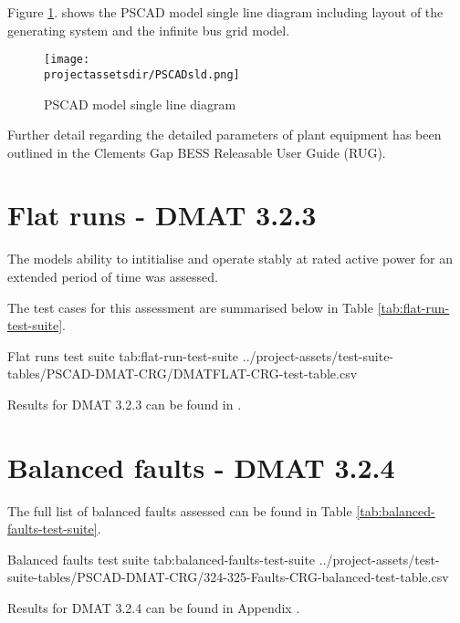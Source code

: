 \documentclass{../grid-link-report}
\newcommand{\projectassetsdir}{../project-assets}
\begin{document}
	Figure \ref{fig:PSCADmodelSLD}. shows the PSCAD model single line diagram including layout of the generating system and the infinite bus grid model.
	
	\begin{figure}[H]
		\centering
		\texttt{[image: \\projectassetsdir/PSCADsld.png]}
		\caption{PSCAD model single line diagram}
		\label{fig:PSCADmodelSLD}
	\end{figure}
	
	Further detail regarding the detailed parameters of plant equipment has been outlined in the Clements Gap BESS Releasable User Guide (RUG)\cite{pscad-rug}.
	
	
	\section{Flat runs - DMAT 3.2.3}
	The models ability to intitialise and operate stably at rated active power for an extended period of time was assessed.
	
	The test cases for this assessment are summarised below in Table \ref{tab:flat-run-test-suite}.
	
	{
		\fontsize{7}{9}\selectfont
		\autoscaledlongtable
		{Flat runs test suite}
		{tab:flat-run-test-suite}
		{\projectassetsdir/test-suite-tables/PSCAD-DMAT-CRG/DMATFLAT-CRG-test-table.csv}
	}
	
	Results for DMAT 3.2.3 can be found in .
	
	\section{Balanced faults - DMAT 3.2.4}
	\label{sec:balanced-faults}
	
	
	The full list of balanced faults assessed can be found in Table \ref{tab:balanced-faults-test-suite}.
	
	{
		\fontsize{6}{8}\selectfont
		\autoscaledlongtable
		{Balanced faults test suite}
		{tab:balanced-faults-test-suite}
		{\projectassetsdir/test-suite-tables/PSCAD-DMAT-CRG/324-325-Faults-CRG-balanced-test-table.csv}
	}
	
	Results for DMAT 3.2.4 can be found in Appendix .
	
\end{document}
